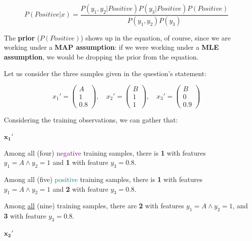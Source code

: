 \documentclass[12pt]{article}
\begin{document}
\begin{enumerate}[leftmargin=\labelsep]
        $$
          P(Positive | x) = \frac{P(y_1, y_2 | Positive) P(y_3 | Positive) P(Positive)}{P(y_1, y_2) P(y_3)}
        $$

        The \textbf{prior} ($P(Positive)$) shows up in the equation, of course, since
        we are working under a \textbf{MAP assumption}: if we were working under
        a \textbf{MLE assumption}, we would be dropping the prior from the equation.

        Let us consider the three samples given in the question's statement:

        $$
          x_1' = \begin{pmatrix}
            A \\
            1 \\
            0.8
          \end{pmatrix}, \quad
          x_2' = \begin{pmatrix}
            B \\
            1 \\
            1
          \end{pmatrix}, \quad
          x_3' = \begin{pmatrix}
            B \\
            0 \\
            0.9
          \end{pmatrix}
        $$

        Considering the training observations, we can gather that:

        \begin{multicols}{3}
          \setlength{\columnseprule}{1pt}
          \def\columnseprulecolor{\color{black}}
          \centering

          $\mathbf{x_1'}$

          Among all (four) \textcolor{purple}{negative} training samples, there is \textbf{1} with features $y_1 = A \wedge y_2 = 1$ and
          \textbf{1} with feature $y_3 = 0.8$.

          Among all (five) \textcolor{teal}{positive} training samples, there is \textbf{1} with features $y_1 = A \wedge y_2 = 1$ and
          \textbf{2} with feature $y_3 = 0.8$.

          Among \underline{all} (nine) training samples, there are \textbf{2} with features $y_1 = A \wedge y_2 = 1$, and
          \textbf{3} with feature $y_3 = 0.8$.

          \columnbreak

          $\mathbf{x_2'}$


\end{multicols}
\end{enumerate}
\end{document}

